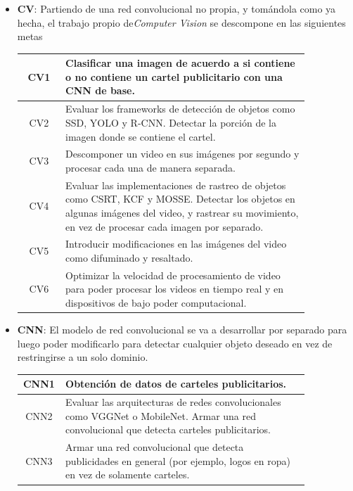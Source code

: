 \documentclass[a4paper]{article}
\begin{document}
\begin{itemize}
\item \textbf{CV}: Partiendo de una red convolucional no propia, y tomándola como ya hecha, el trabajo propio de\emph{Computer Vision} se descompone en las siguientes metas

\begin{center}
\begin{tabular}{c m{0.85\linewidth}} \toprule
    CV1 & Clasificar una imagen de acuerdo a si contiene o no contiene un cartel publicitario con una CNN de base. \\ \midrule
    CV2 & Evaluar los frameworks de detección de objetos como SSD, YOLO y R-CNN. \newline Detectar la porción de la imagen donde se contiene el cartel. \\ \midrule
    CV3 & Descomponer un video en sus imágenes por segundo y procesar cada una de manera separada. \\ \midrule
    CV4 & Evaluar las implementaciones de rastreo de objetos como CSRT, KCF y MOSSE. \newline Detectar los objetos en algunas imágenes del video, y rastrear su movimiento, en vez de procesar cada imagen por separado. \\ \midrule
    CV5 & Introducir modificaciones en las imágenes del video como difuminado y resaltado. \\ \midrule
    CV6 & Optimizar la velocidad de procesamiento de video para poder procesar los videos en tiempo real y en dispositivos de bajo poder computacional. \\ \bottomrule
\end{tabular}
\end{center}

\item \textbf{CNN}: El modelo de red convolucional se va a desarrollar por separado para luego poder modificarlo para detectar cualquier objeto deseado en vez de restringirse a un solo dominio.

\begin{center}
\begin{tabular}{c m{0.85\linewidth}} \toprule
    CNN1 & Obtención de datos de carteles publicitarios. \\ \midrule
    CNN2 & Evaluar las arquitecturas de redes convolucionales como VGGNet o MobileNet. \newline Armar una red convolucional que detecta carteles publicitarios. \\ \midrule
    CNN3 & Armar una red convolucional que detecta publicidades en general (por ejemplo, logos en ropa) en vez de solamente carteles. \\ \bottomrule
\end{tabular}
\end{center}


\end{itemize}
\end{document}
